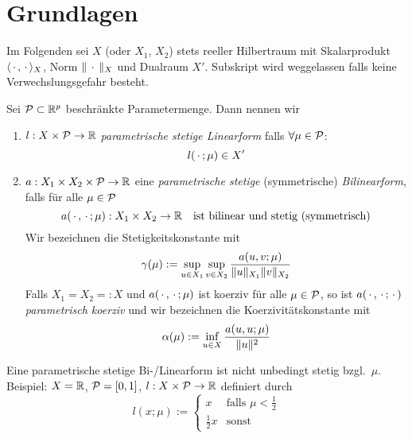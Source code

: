 \section{Grundlagen}
\label{sec-2}

Im Folgenden sei $X$ (oder $X_1$, $X_2$) stets reeller Hilbertraum mit Skalarprodukt $\langle \,\cdot\,, \,\cdot\, \rangle_X$, Norm $\|\,\cdot\,\|_X$ und Dualraum $X'$.
Subskript wird weggelassen falls keine Verwechslungsgefahr besteht.

\begin{defn}
	Sei $\mathcal{P} \subset \mathbb{R}^p$ beschränkte Parametermenge. Dann nennen wir
	\begin{enumerate}
		\item $l: X \times \mathcal{P} \to \mathbb{R}$ \emph{parametrische stetige Linearform} falls $\forall \mu \in \mathcal{P}$:
			\[
				l(\,\cdot\,;\mu) \in X'
			\]
		\item $a: X_1 \times X_2 \times \mathcal{P} \to \mathbb{R}$ eine \emph{parametrische stetige} (symmetrische) \emph{Bilinearform}, falls für alle $\mu \in \mathcal{P}$
			\[
				a(\,\cdot\,,\,\cdot\,;\mu) : X_1 \times X_2 \to \mathbb{R} \quad \text{ist bilinear und stetig (symmetrisch)}
			\]
			Wir bezeichnen die Stetigkeitskonstante mit
			\[
				\gamma(\mu) := \sup_{u \in X_1} \sup_{v \in X_2} \frac{a(u,v;\mu)}{\|u\|_{X_1}\|v\|_{X_2}}
			\]
			Falls $X_1 = X_2 =: X$ und $a(\,\cdot\,,\,\cdot\,;\mu)$ ist koerziv für alle $\mu \in \mathcal{P}$, so ist $a(\,\cdot\,,\,\cdot\,;\,\cdot\,)$ \emph{parametrisch koerziv} und wir bezeichnen die Koerzivitätskonstante mit
			\[
				\alpha(\mu) := \inf_{u \in X} \frac{a(u,u;\mu)}{\|u\|^2}
			\]
	\end{enumerate}
\end{defn}

\begin{bem}
	Eine parametrische stetige Bi-/Linearform ist nicht unbedingt stetig bzgl.\ $\mu$.
	Beispiel: $X = \mathbb{R}$, $\mathcal{P} = [0,1]$, $l : X \times \mathcal{P} \to \mathbb{R}$ definiert durch
	\[
		l(x;\mu) := \begin{cases}
			x & \text{falls } \mu < \frac 1 2 \\
			\frac 1 2 x & \text{sonst}
		\end{cases}
	\]
\end{bem}

